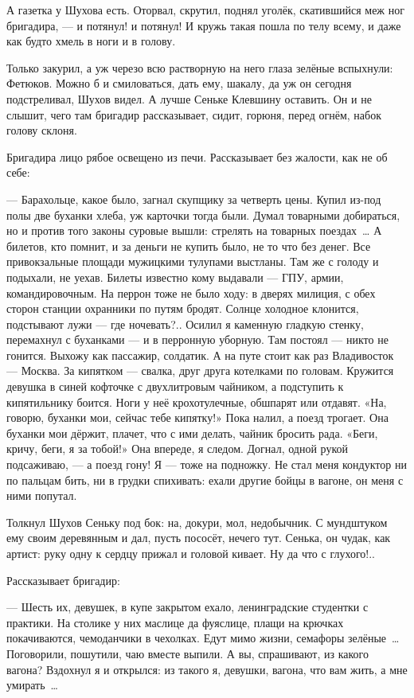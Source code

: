 А газетка у Шухова есть. Оторвал, скрутил, поднял уголёк, скатившийся меж ног бригадира, --- и потянул! и потянул! И кружь такая пошла по телу всему, и даже как будто хмель в ноги и в голову.

Только закурил, а уж черезо всю растворную на него глаза зелёные вспыхнули: Фетюков. Можно б и смиловаться, дать ему, шакалу, да уж он сегодня подстреливал, Шухов видел. А лучше Сеньке Клевшину оставить. Он и не слышит, чего там бригадир рассказывает, сидит, горюня, перед огнём, набок голову склоня.

Бригадира лицо рябое освещено из печи. Рассказывает без жалости, как не об себе:

--- Барахольце, какое было, загнал скупщику за четверть цены. Купил из-под полы две буханки хлеба, уж карточки тогда были. Думал товарными добираться, но и против того законы суровые вышли: стрелять на товарных поездах~\dots{} А билетов, кто помнит, и за деньги не купить было, не то что без денег. Все привокзальные площади мужицкими тулупами выстланы. Там же с голоду и подыхали, не уехав. Билеты известно кому выдавали --- ГПУ, армии, командировочным. На перрон тоже не было ходу: в дверях милиция, с обех сторон станции охранники по путям бродят. Солнце холодное клонится, подстывают лужи --- где ночевать?.. Осилил я каменную гладкую стенку, перемахнул с буханками --- и в перронную уборную. Там постоял --- никто не гонится. Выхожу как пассажир, солдатик. А на путе стоит как раз Владивосток --- Москва. За кипятком --- свалка, друг друга котелками по головам. Кружится девушка в синей кофточке с двухлитровым чайником, а подступить к кипятильнику боится. Ноги у неё крохотулечные, обшпарят или отдавят. «На, говорю, буханки мои, сейчас тебе кипятку!» Пока налил, а поезд трогает. Она буханки мои дёржит, плачет, что с ими делать, чайник бросить рада. «Беги, кричу, беги, я за тобой!» Она впереде, я следом. Догнал, одной рукой подсаживаю, --- а поезд гону! Я --- тоже на подножку. Не стал меня кондуктор ни по пальцам бить, ни в грудки спихивать: ехали другие бойцы в вагоне, он меня с ними попутал.

Толкнул Шухов Сеньку под бок: на, докури, мол, недобычник. С мундштуком ему своим деревянным и дал, пусть пососёт, нечего тут. Сенька, он чудак, как артист: руку одну к сердцу прижал и головой кивает. Ну да что с глухого!..

Рассказывает бригадир:

--- Шесть их, девушек, в купе закрытом ехало, ленинградские студентки с практики. На столике у них маслице да фуяслице, плащи на крючках покачиваются, чемоданчики в чехолках. Едут мимо жизни, семафоры зелёные~\dots{} Поговорили, пошутили, чаю вместе выпили. А вы, спрашивают, из какого вагона? Вздохнул я и открылся: из такого я, девушки, вагона, что вам жить, а мне умирать~\dots{}

